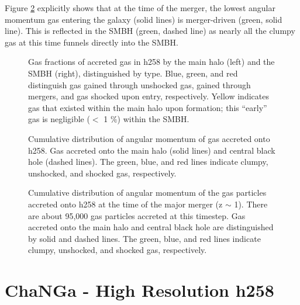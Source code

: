 \documentclass[12pt,headA,chapB]{fiskthesis}
\begin{document}
Figure \ref{h258angmom_merger} explicitly shows that at the time of the merger, the lowest angular momentum gas entering the galaxy (solid lines) is merger-driven (green, solid line). This is reflected in the SMBH (green, dashed line) as nearly all the clumpy gas at this time funnels directly into the SMBH.


\begin{figure}[h]
\centerline{}
\caption[GASOLINE h258 Galaxy and SMBH Gas Fractions at z=0]{Gas fractions of accreted gas in h258 by the main halo (left) and the SMBH (right), distinguished by type. Blue, green, and red distinguish gas gained through unshocked gas, gained through mergers, and gas shocked upon entry, respectively. Yellow indicates gas that existed within the main halo upon formation; this ``early'' gas is negligible ($<$ 1 $\%$) within the SMBH.}
\label{h258stackfrac} 
\end{figure}

\begin{figure}[p]
\centerline{}
\caption[GASOLINE h258 Cumulative Angular Momentum Distribution]{ Cumulative distribution of angular momentum of gas accreted onto h258.  Gas accreted onto the main halo (solid lines) and central black hole (dashed lines). The green, blue, and red lines indicate clumpy, unshocked, and shocked gas, respectively.}
\label{h258angmom} 

\centerline{}
\caption[GASOLINE h258 Merger Angular Momentum Distribution]{ Cumulative distribution of angular momentum of the gas particles accreted onto h258 at the time of the major merger (z $\sim$ 1). There are about 95,000 gas particles accreted at this timestep. Gas accreted onto the main halo and central black hole are distinguished by solid and dashed lines. The green, blue, and red lines indicate clumpy, unshocked, and shocked gas, respectively.}
\label{h258angmom_merger} 
\end{figure}


\section{ChaNGa - High Resolution h258}
\end{document}

